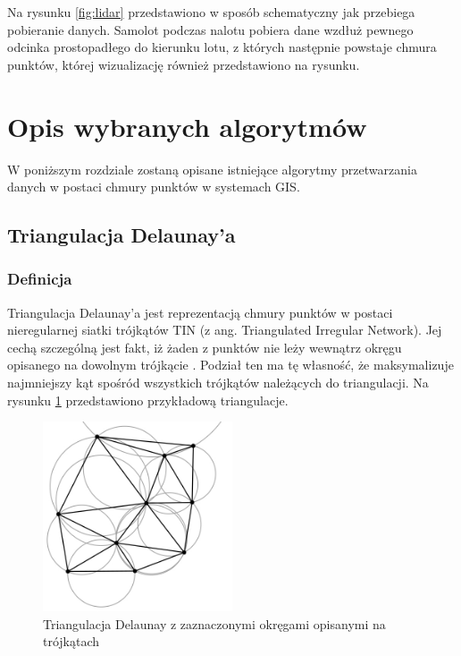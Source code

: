 Na rysunku \ref{fig:lidar} przedstawiono w sposób schematyczny jak przebiega pobieranie danych. Samolot podczas nalotu pobiera dane wzdłuż pewnego odcinka prostopadłego do kierunku lotu, z których następnie powstaje chmura punktów, której wizualizację również przedstawiono na rysunku.

\section{Opis wybranych algorytmów}

W poniższym rozdziale zostaną opisane istniejące algorytmy przetwarzania danych w postaci chmury punktów w systemach GIS.

\subsection{Triangulacja Delaunay'a}

\subsubsection{Definicja}
Triangulacja Delaunay'a jest reprezentacją chmury punktów w postaci nieregularnej siatki trójkątów TIN (z ang. Triangulated Irregular Network).
Jej cechą szczególną jest fakt, iż żaden z punktów nie leży wewnątrz okręgu opisanego na dowolnym trójkącie \cite{Lee1980}. Podział ten ma tę własność, że maksymalizuje najmniejszy kąt spośród 
wszystkich trójkątów należących do triangulacji. Na rysunku \ref{fig:triangulacja} przedstawiono przykładową triangulacje.

\begin{figure}[h!]
    \centering
    \includegraphics[width=0.5\textwidth]{img/triangulacja.jpg}
    \caption{Triangulacja Delaunay z zaznaczonymi okręgami opisanymi na trójkątach}
    \label{fig:triangulacja}
\end{figure}

